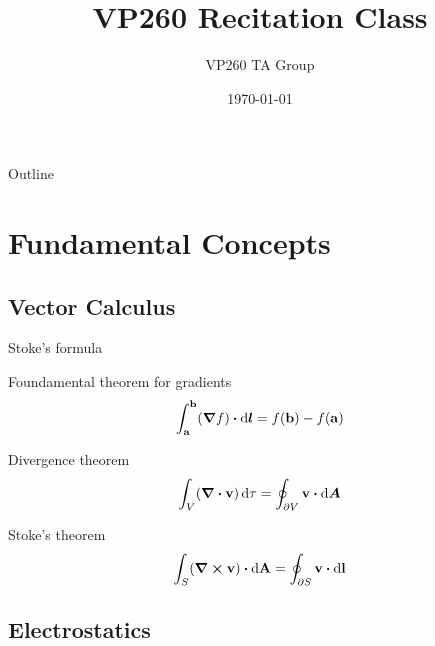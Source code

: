 \documentclass{beamer}
\title[VP260 RC]{VP260 Recitation Class} %
\author{VP260 TA Group} %
\institute[UM-SJTU JI] %
{
    University of Michigan - Shanghai Jiao Tong University Joint Institute\\%
\medskip
}
\date{\today} %
\begin{document}
\begin{frame}
    \titlepage %
\end{frame}

\begin{frame}{Outline}
\tableofcontents
\end{frame}

\section{Fundamental Concepts}

\subsection{Vector Calculus} %

\begin{frame}{Stoke's formula}
	\begin{beamerboxesrounded}{Foundamental theorem for gradients}
		\begin{equation}
			\int_{\vb{a}}^{\vb{b}} (\grad f) \vdot \dd{\vb*{l}} = f(\vb{b}) - f(\vb{a})
		\end{equation}
	\end{beamerboxesrounded}
	
	\begin{beamerboxesrounded}{Divergence theorem}
		\begin{equation}
			\int_V (\div \vb{v}) \dd{\tau} = \oint_{\partial V} \vb{v} \vdot \dd{\vb*{A}}
		\end{equation}
	\end{beamerboxesrounded}

	\begin{beamerboxesrounded}{Stoke's theorem}
		\begin{equation}
			\int_S (\curl \vb{v}) \vdot \dd{\vb{A}} = \oint_{\partial S} \vb{v} \vdot \dd{\vb{l}}
		\end{equation}
	\end{beamerboxesrounded}
\end{frame}

\subsection{Electrostatics}
\end{document}
